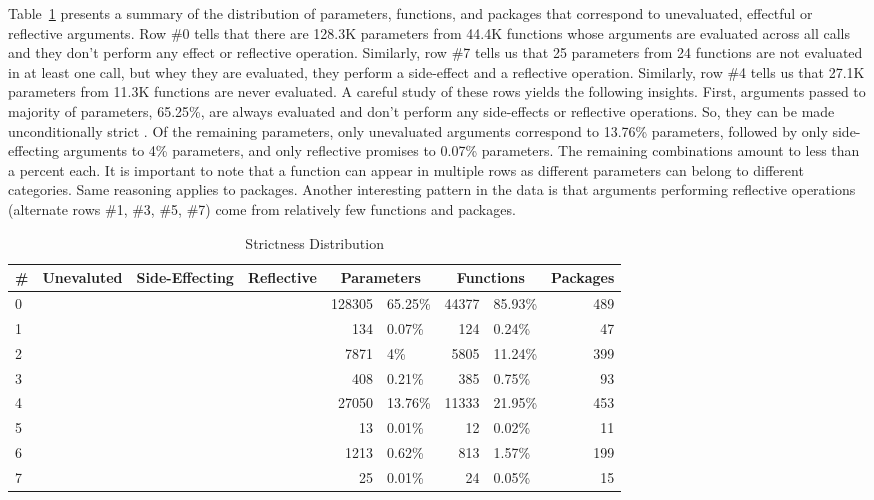 \documentclass[review,nonacm,screen,acmsmall,anonymous=true]{acmart}
\newcommand{\xmark}{\textcolor{red}{\ding{55}}}
\newcommand{\cmark}{\textcolor{green}{\ding{51}}}
\begin{document}
Table~\ref{table:strictdist} presents a summary of the distribution of
parameters, functions, and packages that correspond to unevaluated, effectful or
reflective arguments. Row \#0 tells that there are 128.3K parameters from 44.4K
functions whose arguments are evaluated across all calls and they don't perform
any effect or reflective operation. Similarly, row \#7 tells us that 25
parameters from 24 functions are not evaluated in at least one call, but whey
they are evaluated, they perform a side-effect and a reflective operation.
Similarly, row \#4 tells us that 27.1K parameters from 11.3K functions are never
evaluated. A careful study of these rows yields the following insights. First,
arguments passed to majority of parameters, 65.25\%, are always evaluated and
don't perform any side-effects or reflective operations. So, they can be made
unconditionally strict . Of the remaining parameters, only unevaluated arguments
correspond to 13.76\% parameters, followed by only side-effecting arguments to
4\% parameters, and only reflective promises to 0.07\% parameters. The remaining
combinations amount to less than a percent each. It is important to note that a
function can appear in multiple rows as different parameters can belong to
different categories. Same reasoning applies to packages. Another interesting
pattern in the data is that arguments performing reflective operations
(alternate rows \#1, \#3, \#5, \#7) come from relatively few functions and
packages.

\begin{table}
  \vspace{-3mm}
  \small
  \caption{Strictness Distribution} \label{table:strictdist}
  \centering
  \begin{tabular}{lcccr|lr|lr}
    \toprule
    \#&\bf Unevaluted & \bf Side-Effecting & \bf Reflective & \multicolumn{2}{c}{\textbf{Parameters}} & \multicolumn{2}{c}{\textbf{Functions}}& \bf Packages\\
    \midrule
    0&\xmark{}&\xmark{}&\xmark{}&128305&65.25\%&44377&85.93\%&489\\
    1&\xmark{}&\xmark{}&\cmark{}&134&0.07\%&124&0.24\%&47\\
    2&\xmark{}&\cmark{}&\xmark{}&7871&4\%&5805&11.24\%&399\\
    3&\xmark{}&\cmark{}&\cmark{}&408&0.21\%&385&0.75\%&93\\
    4&\cmark{}&\xmark{}&\xmark{}&27050&13.76\%&11333&21.95\%&453\\
    5&\cmark{}&\xmark{}&\cmark{}&13&0.01\%&12&0.02\%&11\\
    6&\cmark{}&\cmark{}&\xmark{}&1213&0.62\%&813&1.57\%&199\\
    7&\cmark{}&\cmark{}&\cmark{}&25&0.01\%&24&0.05\%&15\\
    \bottomrule
  \end{tabular}
\end{table}
\end{document}
